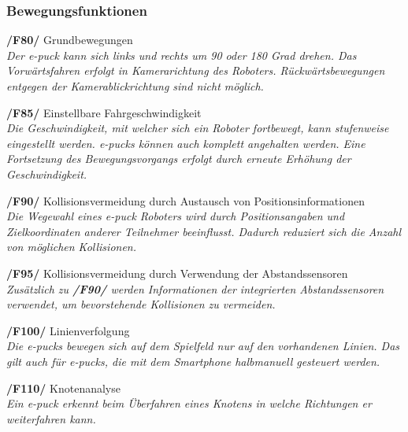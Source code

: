 \documentclass[10pt,a4paper]{article}
\begin{document}
			\subsubsection{Bewegungsfunktionen}
				\begin{list}{}{\leftmargin=1cm}
					\item[\textbf{/F80/}] Grundbewegungen
						\\ \textsl{Der e-puck kann sich links und rechts um 90 oder 180 Grad drehen. Das Vorwärtsfahren erfolgt
							in Kamerarichtung des Roboters. Rückwärtsbewegungen entgegen der Kamerablickrichtung sind nicht möglich.}
					\item[\textbf{/F85/}] Einstellbare Fahrgeschwindigkeit
						\\ \textsl{Die Geschwindigkeit, mit welcher sich ein Roboter fortbewegt, kann stufenweise eingestellt werden. e-pucks
							können auch komplett angehalten werden. Eine Fortsetzung des Bewegungsvorgangs erfolgt durch erneute Erhöhung
							der Geschwindigkeit.}			
					\item[\textbf{/F90/}] Kollisionsvermeidung durch Austausch von Positionsinformationen
						\\ \textsl{Die Wegewahl eines e-puck Roboters wird durch Positionsangaben und Zielkoordinaten anderer Teilnehmer
							beeinflusst. Dadurch reduziert sich die Anzahl von möglichen Kollisionen.}		
					\item[\textbf{/F95/}] Kollisionsvermeidung durch Verwendung der Abstandssensoren
						\\ \textsl{Zusätzlich zu \textbf{/F90/} werden Informationen der integrierten Abstandssensoren verwendet, um
							bevorstehende Kollisionen zu vermeiden.}														
					\item[\textbf{/F100/}] Linienverfolgung
						\\ \textsl{Die e-pucks bewegen sich auf dem Spielfeld nur auf den vorhandenen Linien. Das gilt auch für e-pucks,
						die mit dem Smartphone halbmanuell gesteuert werden.}
					\item[\textbf{/F110/}] Knotenanalyse
						\\ \textsl{Ein e-puck erkennt beim Überfahren eines \gls{Knoten}s in welche Richtungen er weiterfahren kann.}
				\end{list}
\end{document}
